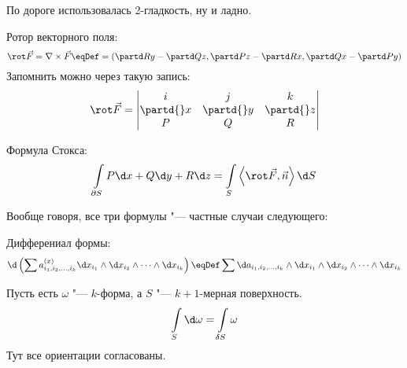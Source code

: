 \begin{Rem}
	По дороге использовалась 2-гладкость, ну и ладно.
\end{Rem}

\begin{Def}
	Ротор векторного поля:
	\[ \rot \vec F = \nabla \times \vec F \eqDef = \left(\partd Ry - \partd Qz, \partd Pz - \partd Rx, \partd Qx - \partd Py\right) \]
	Запомнить можно через такую запись:
	\[ \rot \vec F = \begin{vmatrix} i & j & k \\ \partd{}x & \partd{}y & \partd{}z \\ P & Q & R \end{vmatrix} \]
\end{Def}

\begin{Rem}
	Формула Стокса:
	\[ \int\limits_{\partial S} P \d x + Q \d y + R \d z = \int\limits_S \left< \rot \vec F, \vec n\right> \d S \]
\end{Rem}

Вообще говоря, все три формулы "--- частные случаи следующего:
\begin{Def}
	Дифферениал формы:
	\[
		\d \left( \sum a_{i_1,i_2,\dots,i_k}^{(x)} \d x_{i_1} \wedge \d x_{i_2} \wedge \dots \wedge \d x_{i_k} \right)
		\eqDef \sum \d a_{i_1,i_2,\dots,i_k} \wedge \d x_{i_1} \wedge \d x_{i_2} \wedge \dots \wedge \d x_{i_k}
	\]
\end{Def}

\begin{theorem}
	Пусть есть $\omega$ "--- $k$-форма, а $S$ "--- $k+1$-мерная поверхность.
	\[
		\int\limits_S \d \omega = \int\limits_{\delta S} \omega
	\]
	Тут все ориентации согласованы.
\end{theorem}


